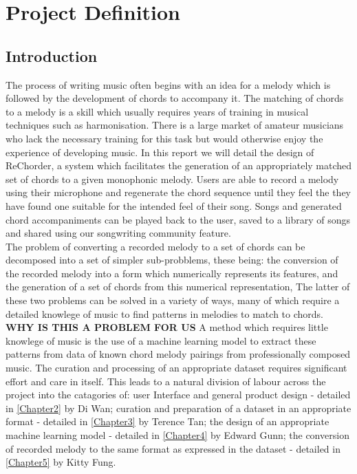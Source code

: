 
\chapter{Project Definition} %

\label{Chapter1} %


\section{Introduction}

The process of writing music often begins with an idea for a melody which is followed by the development of chords to accompany it.
The matching of chords to a melody is a skill which usually requires years of training in musical techniques such as harmonisation.
There is a large market of amateur musicians who lack the necessary training for this task but would otherwise enjoy the experience of developing music.  
In this report we will detail the design of ReChorder, a system which facilitates the generation of an appropriately matched set of chords to a given monophonic melody. \label{Chap1Sec1}
Users are able to record a melody using their microphone and regenerate the chord sequence until they feel the they have found one suitable for the intended feel of their song.
Songs and generated chord accompaniments can be played back to the user, saved to a library of songs and shared using our songwriting community feature. \\
The problem of converting a recorded melody to a set of chords can be decomposed into a set of simpler sub-probblems, these being:
the conversion of the recorded melody into a form which numerically represents its features,
and the generation of a set of chords from this numerical representation,
The latter of these two problems can be solved in a variety of ways, many of which require a detailed knowlege of music to find patterns in melodies to match to chords.  
\textbf{WHY IS THIS A PROBLEM FOR US}
A method which requires little knowlege of music is the use of a machine learning model to extract these patterns from data of known chord melody pairings from professionally composed music. 
The curation and processing of an appropriate dataset requires significant effort and care in itself.
This leads to a natural division of labour across the project into the catagories of:
\label{sec:Introduction}
user Interface and general product design - detailed in \ref{Chapter2} by Di Wan;
curation and preparation of a dataset in an appropriate format - detailed in \ref{Chapter3} by Terence Tan;
the design of an appropriate machine learning model - detailed in \ref{Chapter4} by Edward Gunn;
the conversion of recorded melody to the same format as expressed in the dataset - detailed in \ref{Chapter5} by Kitty Fung.


